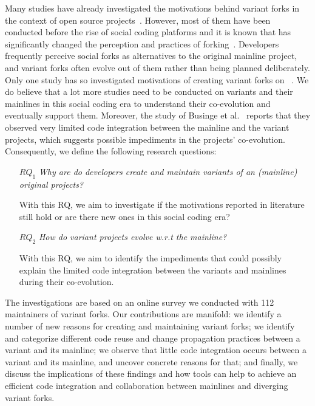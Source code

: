 Many studies have already investigated the motivations behind variant forks in the context of open source projects~\cite{Linus:2012Perspectives,Gregorio:2012,Viseur:2012Forks,Linus:2013CodeForking,Linus:2011ToFork,Gamalielsson:2014Sustainability}.
However, most of them have been conducted before the rise of social coding platforms and it is known that \gh has significantly changed the perception and practices of forking~\cite{Zhou:2020}.
Developers frequently perceive social forks as alternatives to the original mainline project, and variant forks often evolve out of them rather than being planned deliberately. Only one study has so investigated motivations of creating variant forks on \gh~\cite{Zhou:2020}. We do believe that a lot more studies need to be conducted on variants and their mainlines in this social coding era to understand their co-evolution and eventually support them.
Moreover, the study of Businge et al.~\cite{businge:emse:2021} reports that they observed very limited code integration between the mainline and the variant projects, which suggests possible impediments in the projects' co-evolution.  
Consequently, we define the following research questions:
\begin{itemize}
\item [$RQ_1$] \textit{Why are do developers create and maintain variants of an (mainline) original projects?}
\item [] With this RQ, we aim to investigate if the motivations reported in literature still hold or are there new ones in this social coding era?

\item [$RQ_2$] \textit{How do variant projects evolve w.r.t the mainline?}
\item [] With this RQ, we aim to identify the impediments that could possibly explain the limited code integration between the variants and mainlines during their co-evolution.
\end{itemize}


The investigations are based on an online survey we conducted with 112 maintainers of variant forks.
%
Our contributions are manifold:
we identify a number of new reasons for creating and maintaining variant forks;
we identify and categorize different code reuse and change propagation practices between a variant and its mainline;
we observe that little code integration occurs between a variant and its mainline, and uncover concrete reasons for that;
and finally, we discuss the implications of these findings and how tools can help to achieve an efficient code integration and collaboration between mainlines and diverging variant forks.

